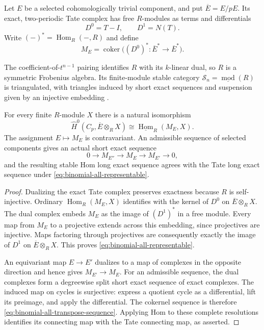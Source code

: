 Let $E$ be a selected cohomologically trivial component, and put
$\overline E=E/pE$.  Its exact, two-periodic Tate complex has
free $R$-modules as terms and differentials
\[
 D^0=T-I,\qquad D^1=N(T).
\]
Write $(-)^*=\operatorname{Hom}_R(-,R)$ and define
\[
 M_E=\operatorname{coker}
 \bigl((D^0)^*:\overline E^*\longrightarrow\overline E^*\bigr).
\]

The coefficient-of-$t^{n-1}$ pairing identifies $R$ with its
$k$-linear dual, so $R$ is a symmetric Frobenius algebra.
Its finite-module stable category
$\mathcal S_n=\underline{\operatorname{mod}}(R)$ is triangulated,
with triangles induced by short exact sequences and suspension
given by an injective embedding
\citep[Section~13.4, Theorem~13.7, p.~50 of the author's
version]{Buhler2010}.

\begin{lemma}\label{lem:binomial-all-representability}
For every finite $R$-module $X$ there is a natural isomorphism
\begin{equation}\label{eq:binomial-all-representable}
 \widehat H^0(C_p,\overline E\otimes_R X)
 \cong \underline{\operatorname{Hom}}_R(M_E,X).
\end{equation}
The assignment $E\mapsto M_E$ is contravariant.
An admissible sequence of selected components gives an actual
short exact sequence
\begin{equation}\label{eq:binomial-all-transpose-sequence}
 0\longrightarrow M_{E''}\longrightarrow M_E
   \longrightarrow M_{E'}\longrightarrow0,
\end{equation}
and the resulting stable Hom long exact sequence agrees with
the Tate long exact sequence under \eqref{eq:binomial-all-representable}.
\end{lemma}

\begin{proof}
Dualizing the exact Tate complex preserves exactness because
$R$ is self-injective.
Ordinary $\operatorname{Hom}_R(M_E,X)$ identifies with the
kernel of $D^0$ on $\overline E\otimes_R X$.
The dual complex embeds $M_E$ as the image of $(D^1)^*$ in
a free module.  Every map from $M_E$ to a projective extends
across this embedding, since projectives are injective.
Maps factoring through projectives are consequently exactly
the image of $D^1$ on $\overline E\otimes_R X$.  This proves
\eqref{eq:binomial-all-representable}.

An equivariant map $E\to E'$ dualizes to a map of complexes
in the opposite direction and hence gives $M_{E'}\to M_E$.
For an admissible sequence, the dual complexes form a
degreewise split short exact sequence of exact complexes.
The induced map on cycles is surjective: express a quotient
cycle as a differential, lift its preimage, and apply the
differential.  The cokernel sequence is therefore
\eqref{eq:binomial-all-transpose-sequence}.
Applying Hom to these complete resolutions identifies its
connecting map with the Tate connecting map, as asserted.
\end{proof}

